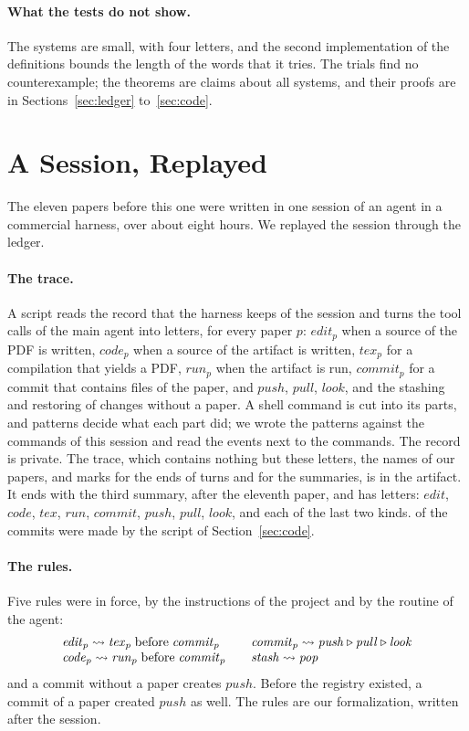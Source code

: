 \documentclass[acmsmall,nonacm,screen]{acmart}
\newcommand{\nm}[1]{\mathit{#1}}
\newcommand{\later}{\mathbin{\triangleright}}
\newcommand{\bef}{\mathrel{\text{before}}}
\newcommand{\creates}{\rightsquigarrow}
\newcommand{\edit}{\nm{edit}}
\newcommand{\tex}{\nm{tex}}
\newcommand{\commit}{\nm{commit}}
\newcommand{\push}{\nm{push}}
\newcommand{\pull}{\nm{pull}}
\newcommand{\look}{\nm{look}}
\newcommand{\code}{\nm{code}}
\newcommand{\run}{\nm{run}}
\begin{document}
\paragraph{What the tests do not show.} The systems are small, with four letters, and the
second implementation of the definitions bounds the length of the words that it tries. The
trials find no counterexample; the theorems are claims about all systems, and their proofs
are in Sections~\ref{sec:ledger} to~\ref{sec:code}.

\section{A Session, Replayed}
\label{sec:session}

The eleven papers before this one were written in one session of an agent in a commercial
harness, over about eight hours. We replayed the session through the ledger.

\paragraph{The trace.} A script reads the record that the harness keeps of the session and
turns the tool calls of the main agent into letters, for every paper $p$: $\edit_p$ when a
source of the PDF is written, $\code_p$ when a source of the artifact is written, $\tex_p$
for a compilation that yields a PDF, $\run_p$ when the artifact is run, $\commit_p$ for a
commit that contains files of the paper, and $\push$, $\pull$, $\look$, and the stashing
and restoring of changes without a paper. A shell command is cut into its parts, and
patterns decide what each part did; we wrote the patterns against the commands of this
session and read the events next to the commands. The record is private. The trace, which
contains nothing but these letters, the names of our papers, and marks for the ends of
turns and for the summaries, is in the artifact. It ends with the third
summary, after the eleventh paper, and has \exSessionLetters{} letters: \exSessionEdits{}
$\edit$, \exSessionCodes{} $\code$, \exSessionTexs{} $\tex$, \exSessionRuns{} $\run$,
\exSessionCommits{} $\commit$, \exSessionPushs{} $\push$, \exSessionPulls{} $\pull$,
\exSessionLooks{} $\look$, and \exSessionStashs{} each of the last two kinds. \exSessionShipped{} of the
commits were made by the script of Section~\ref{sec:code}.

\paragraph{The rules.} Five rules were in force, by the instructions of the project and by
the routine of the agent:
\[
\begin{array}{l@{\qquad}l}
  \edit_p \creates \tex_p \bef \commit_p & \commit_p \creates \push \later \pull \later \look \\
  \code_p \creates \run_p \bef \commit_p & \nm{stash} \creates \nm{pop}
\end{array}
\]
and a commit without a paper creates $\push$. Before the registry existed, a commit of a
paper created $\push$ as well. The rules are our formalization, written after the session.
\end{document}
